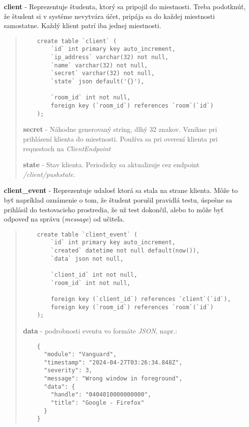 \documentclass{article}
\newcommand{\filedesc}[1]{\vspace{0.3cm} \noindent \textbf{#1}}
\newcommand{\file}[1]{\emph{#1}}
\begin{document}
\filedesc{client} - Reprezentuje študenta, ktorý sa pripojil do miestnosti. Treba podotknúť, že študent si v systéme nevytvára účet, pripája sa do každej miestnosti samostatne. Každý klient patrí iba jednej miestnosti.

\begin{quote}
  \begin{verbatim}
    create table `client` (
        `id` int primary key auto_increment,
        `ip_address` varchar(32) not null,
        `name` varchar(32) not null,
        `secret` varchar(32) not null,
        `state` json default('{}'),

        `room_id` int not null,
        foreign key (`room_id`) references `room`(`id`)
    );
  \end{verbatim}

  \filedesc{secret} - Náhodne generovaný string, dlhý 32 znakov. Vznikne pri prihlásení klienta do miestnosti. Používa sa pri overení klienta pri requestoch na \emph{ClientEndpoint}

  \filedesc{state} - Stav klienta. Periodicky sa aktualizuje cez endpoint \file{/client/pushstate}.

\end{quote}

\filedesc{client{\_}event} - Reprezentuje udalosť ktorá sa stala na strane klienta. Môže to byť napríklad oznámenie o tom, že študent porušil pravidlá testu, úspešne sa prihlásil do testovacieho prostredia, že už test dokončil, alebo to môže byť odpoveď na správu (\emph{message}) od učiteľa.

\begin{quote}

  \begin{verbatim}
    create table `client_event` (
        `id` int primary key auto_increment,
        `created` datetime not null default(now()),
        `data` json not null,
        
        `client_id` int not null,
        `room_id` int not null,

        foreign key (`client_id`) references `client`(`id`),
        foreign key (`room_id`) references `room`(`id`)
    );
  \end{verbatim}

  \filedesc{data} - podrobnosti eventu vo formáte \emph{JSON}, napr.:

  \begin{verbatim}
    {
      "module": "Vanguard",
      "timestamp": "2024-04-27T03:26:34.848Z",
      "severity": 3,
      "message": "Wrong window in foreground",
      "data": {
        "handle": "0404010000000000",
        "title": "Google - Firefox"
      }
    }
  \end{verbatim}

\end{quote}
\end{document}
